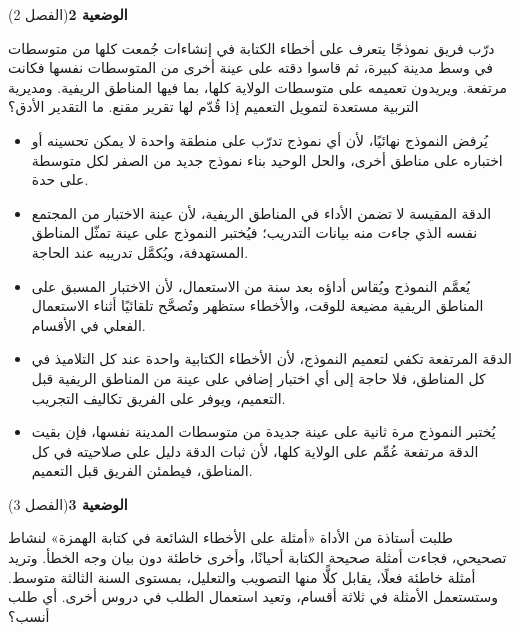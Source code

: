 \documentclass[11pt,a4paper]{article}
\begin{document}
\par\vspace{6pt}
\noindent
{\large\khatt\textbf{الوضعية 2}}\hfill{\small(الفصل 2)}\par\nopagebreak\vspace{3pt}
\setlength{\fboxsep}{7pt}\colorbox{gray!10}{\parbox{\dimexpr\linewidth-14pt}{درّب فريق نموذجًا يتعرف على أخطاء الكتابة في إنشاءات جُمعت كلها من متوسطات في وسط مدينة كبيرة، ثم قاسوا دقته على عينة أخرى من المتوسطات نفسها فكانت مرتفعة. ويريدون تعميمه على متوسطات الولاية كلها، بما فيها المناطق الريفية. ومديرية التربية مستعدة لتمويل التعميم إذا قُدّم لها تقرير مقنع. ما التقدير الأدق؟}}\par\nopagebreak
\begin{itemize}[leftmargin=1.0cm, labelsep=6pt, itemsep=3pt, topsep=4pt, parsep=0pt]
  \item[\textbf{أ)}] يُرفض النموذج نهائيًا، لأن أي نموذج تدرّب على منطقة واحدة لا يمكن تحسينه أو اختباره على مناطق أخرى، والحل الوحيد بناء نموذج جديد من الصفر لكل متوسطة على حدة.
  \item[\textbf{ب)}] الدقة المقيسة لا تضمن الأداء في المناطق الريفية، لأن عينة الاختبار من المجتمع نفسه الذي جاءت منه بيانات التدريب؛ فيُختبر النموذج على عينة تمثّل المناطق المستهدفة، ويُكمَّل تدريبه عند الحاجة.
  \item[\textbf{ج)}] يُعمَّم النموذج ويُقاس أداؤه بعد سنة من الاستعمال، لأن الاختبار المسبق على المناطق الريفية مضيعة للوقت، والأخطاء ستظهر وتُصحَّح تلقائيًا أثناء الاستعمال الفعلي في الأقسام.
  \item[\textbf{د)}] الدقة المرتفعة تكفي لتعميم النموذج، لأن الأخطاء الكتابية واحدة عند كل التلاميذ في كل المناطق، فلا حاجة إلى أي اختبار إضافي على عينة من المناطق الريفية قبل التعميم، ويوفر على الفريق تكاليف التجريب.
  \item[\textbf{هـ)}] يُختبر النموذج مرة ثانية على عينة جديدة من متوسطات المدينة نفسها، فإن بقيت الدقة مرتفعة عُمِّم على الولاية كلها، لأن ثبات الدقة دليل على صلاحيته في كل المناطق، فيطمئن الفريق قبل التعميم.
\end{itemize}
\par\vspace{6pt}
\noindent
{\large\khatt\textbf{الوضعية 3}}\hfill{\small(الفصل 3)}\par\nopagebreak\vspace{3pt}
\setlength{\fboxsep}{7pt}\colorbox{gray!10}{\parbox{\dimexpr\linewidth-14pt}{طلبت أستاذة من الأداة «أمثلة على الأخطاء الشائعة في كتابة الهمزة» لنشاط تصحيحي، فجاءت أمثلة صحيحة الكتابة أحيانًا، وأخرى خاطئة دون بيان وجه الخطأ. وتريد أمثلة خاطئة فعلًا، يقابل كلًّا منها التصويب والتعليل، بمستوى السنة الثالثة متوسط. وستستعمل الأمثلة في ثلاثة أقسام، وتعيد استعمال الطلب في دروس أخرى. أي طلب أنسب؟}}\par\nopagebreak
\end{document}
